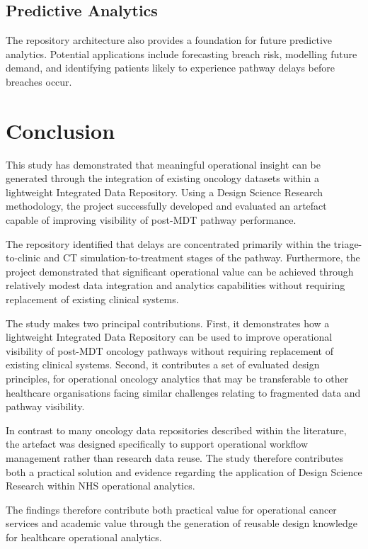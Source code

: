 \subsection{Predictive Analytics}
The repository architecture also provides a foundation for future predictive analytics. Potential applications include forecasting breach risk, modelling future demand, and identifying patients likely to experience pathway delays before breaches occur.

\section{Conclusion}
This study has demonstrated that meaningful operational insight can be generated through the integration of existing oncology datasets within a lightweight Integrated Data Repository. Using a Design Science Research methodology, the project successfully developed and evaluated an artefact capable of improving visibility of post-MDT pathway performance. 

The repository identified that delays are concentrated primarily within the triage-to-clinic and CT simulation-to-treatment stages of the pathway. Furthermore, the project demonstrated that significant operational value can be achieved through relatively modest data integration and analytics capabilities without requiring replacement of existing clinical systems. 

The study makes two principal contributions. First, it demonstrates how a lightweight Integrated Data Repository can be used to improve operational visibility of post-MDT oncology pathways without requiring replacement of existing clinical systems. Second, it contributes a set of evaluated design principles, for operational oncology analytics that may be transferable to other healthcare organisations facing similar challenges relating to fragmented data and pathway visibility. 

In contrast to many oncology data repositories described within the literature, the artefact was designed specifically to support operational workflow management rather than research data reuse. The study therefore contributes both a practical solution and evidence regarding the application of Design Science Research within NHS operational analytics.

The findings therefore contribute both practical value for operational cancer services and academic value through the generation of reusable design knowledge for healthcare operational analytics.
